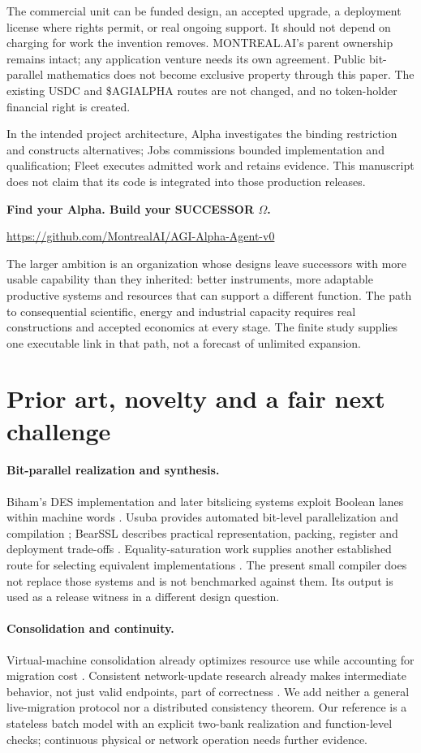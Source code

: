 \documentclass[11pt,letterpaper]{article}
\theoremstyle{definition}\newtheorem{definition}[theorem]{Definition}
\theoremstyle{remark}\newtheorem{remark}[theorem]{Remark}
\newcommand{\phead}[1]{\Needspace{4\baselineskip}\paragraph{#1}}
\begin{document}
The commercial unit can be funded design, an accepted upgrade, a deployment license where rights permit, or real ongoing support. It should not depend on charging for work the invention removes. MONTREAL.AI's parent ownership remains intact; any application venture needs its own agreement. Public bit-parallel mathematics does not become exclusive property through this paper. The existing USDC and \$AGIALPHA routes are not changed, and no token-holder financial right is created.

In the intended project architecture, Alpha investigates the binding restriction and constructs alternatives; Jobs commissions bounded implementation and qualification; Fleet executes admitted work and retains evidence. This manuscript does not claim that its code is integrated into those production releases.

\begin{center}
\textbf{Find your Alpha. Build your SUCCESSOR $\Omega$.}\par\smallskip
\url{https://github.com/MontrealAI/AGI-Alpha-Agent-v0}
\end{center}

The larger ambition is an organization whose designs leave successors with more usable capability than they inherited: better instruments, more adaptable productive systems and resources that can support a different function. The path to consequential scientific, energy and industrial capacity requires real constructions and accepted economics at every stage. The finite study supplies one executable link in that path, not a forecast of unlimited expansion.

\section{Prior art, novelty and a fair next challenge}
\label{sec:related}
\phead{Bit-parallel realization and synthesis.}
Biham's DES implementation and later bitslicing systems exploit Boolean lanes within machine words \citep{biham}. Usuba provides automated bit-level parallelization and compilation \citep{usuba}; BearSSL describes practical representation, packing, register and deployment trade-offs \citep{bearssl}. Equality-saturation work supplies another established route for selecting equivalent implementations \citep{egg}. The present small compiler does not replace those systems and is not benchmarked against them. Its output is used as a release witness in a different design question.

\phead{Consolidation and continuity.}
Virtual-machine consolidation already optimizes resource use while accounting for migration cost \citep{ferdaus}. Consistent network-update research already makes intermediate behavior, not just valid endpoints, part of correctness \citep{reitblatt}. We add neither a general live-migration protocol nor a distributed consistency theorem. Our reference is a stateless batch model with an explicit two-bank realization and function-level checks; continuous physical or network operation needs further evidence.
\end{document}
